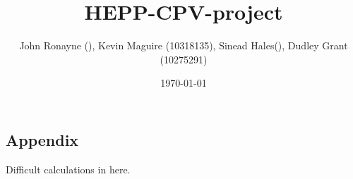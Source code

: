 \documentclass[floatfix,aps,prd,amsmath,amssymb]{revtex4}
\begin{document}
\title{HEPP-CPV-project}
\author{John Ronayne (), Kevin Maguire (10318135), Sinead Hales(), Dudley Grant (10275291)}
\date{\today}

\begin{abstract}
\textit{}
\end{abstract}

\maketitle
{}
 








%

%


\begin{appendix}
\section{Appendix}
Difficult calculations in here.
\end{appendix}
 
\end{document}

